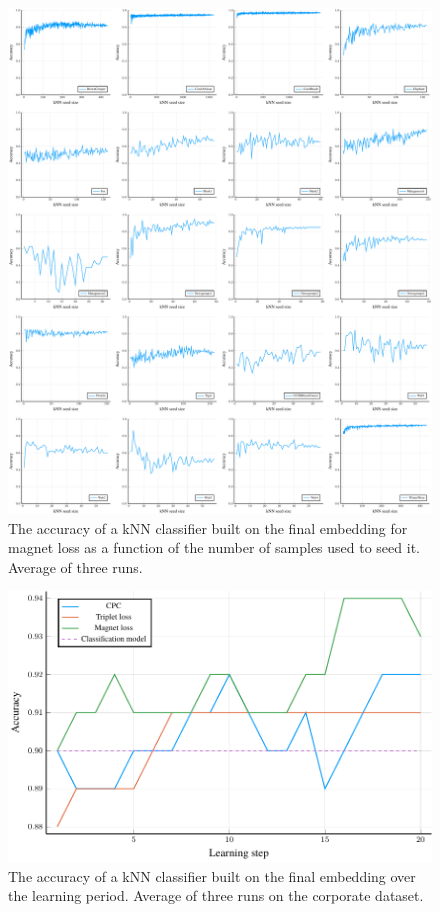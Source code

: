 \begin{figure}
  \centering
  \includegraphics[width=\textwidth]{images/magnet-toy/kNN/magnet-toy-kNN.pdf}
  \caption{The accuracy of a kNN classifier built on the final embedding for magnet loss as a function of the number of samples used to seed it. Average of three runs.}\label{fig:magnet-toy-kNN}
\end{figure}

\begin{figure}
  \centering
  \includegraphics[width=\textwidth]{images/cisco/accuracy/cisco-accuracy.pdf}
  \caption{The accuracy of a kNN classifier built on the final embedding over the learning period. Average of three runs on the corporate dataset.}\label{fig:cisco-kNN}
\end{figure}

